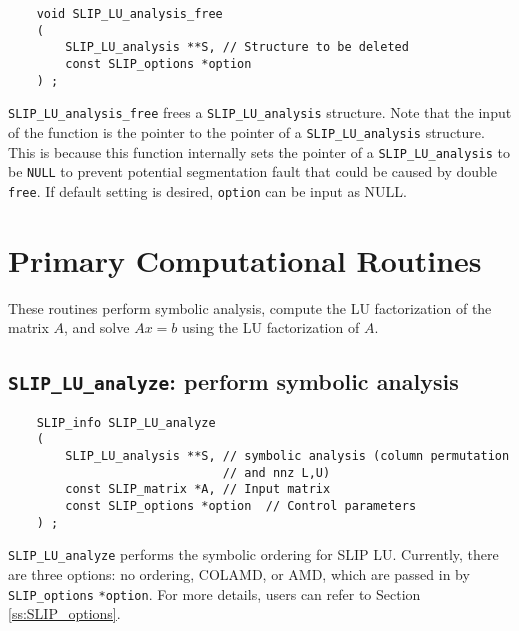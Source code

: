 \documentclass[12pt]{article}
\theoremstyle{definition}
\begin{document}
\begin{mdframed}[userdefinedwidth=6in]
{\footnotesize
\begin{verbatim}
    void SLIP_LU_analysis_free
    (
        SLIP_LU_analysis **S, // Structure to be deleted
        const SLIP_options *option
    ) ;
\end{verbatim}
} \end{mdframed}


\verb|SLIP_LU_analysis_free| frees a \verb|SLIP_LU_analysis| structure.
Note that the input of the function is the pointer to the pointer of a
\verb|SLIP_LU_analysis| structure. This is because this function internally
sets the pointer of a \verb|SLIP_LU_analysis| to be \verb|NULL| to prevent
potential segmentation fault that could be caused by double \verb|free|.
If default setting is desired, \verb|option| can be input as NULL.


\section{Primary Computational Routines}
\label{s:primary}

These routines perform symbolic analysis, compute the LU factorization of the
matrix $A$, and solve $Ax=b$ using the LU factorization of $A$.

\cprotect\subsection{\verb|SLIP_LU_analyze|: perform symbolic analysis}
\label{s:SLIP_LU_analyze}

\begin{mdframed}[userdefinedwidth=6in]
{\footnotesize
\begin{verbatim}
    SLIP_info SLIP_LU_analyze
    (
        SLIP_LU_analysis **S, // symbolic analysis (column permutation
                              // and nnz L,U)
        const SLIP_matrix *A, // Input matrix
        const SLIP_options *option  // Control parameters
    ) ;
\end{verbatim}
} \end{mdframed}

\verb|SLIP_LU_analyze| performs the symbolic ordering for SLIP LU. Currently,
there are three options: no ordering, COLAMD, or AMD, which are passed
in by \verb|SLIP_options| \verb|*option|. For more details, users can refer to Section
\ref{ss:SLIP_options}.
\end{document}
